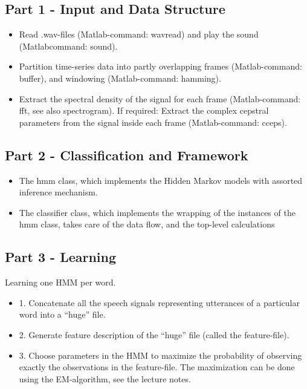 \documentclass[titlepage]{article}
\begin{document}
	\subsection{Part 1 - Input and Data Structure}
\begin{itemize}
\item Read .wav-ﬁles (Matlab-command: wavread) and play the sound (Matlabcommand: sound).
\item Partition time-series data into partly overlapping frames (Matlab-command:
buffer), and windowing (Matlab-command: hamming).
\item Extract the spectral density of the signal for each frame (Matlab-command:
fft, see also spectrogram). If required: Extract the complex cepstral parameters from the signal inside each frame (Matlab-command: cceps).
\end{itemize}

	\subsection{Part 2 - Classification and Framework}
\begin{itemize}
\item The hmm class, which implements the Hidden Markov models with assorted inference mechanism.
\item The classifier class, which implements the wrapping of the instances of the hmm class, takes care of the data ﬂow, and the top-level calculations
\end{itemize}	

    \subsection{Part 3 - Learning}
Learning one HMM per word. 
\begin{itemize}
\item 1. Concatenate all the speech signals representing utterances of a particular word into a “huge” ﬁle.
\item 2. Generate feature description of the “huge” ﬁle (called the feature-ﬁle).
\item 3. Choose parameters in the HMM to maximize the probability of observing exactly the observations in the feature-ﬁle. The maximization can be done using the EM-algorithm, see the lecture notes.
\end{itemize}
\end{document}

